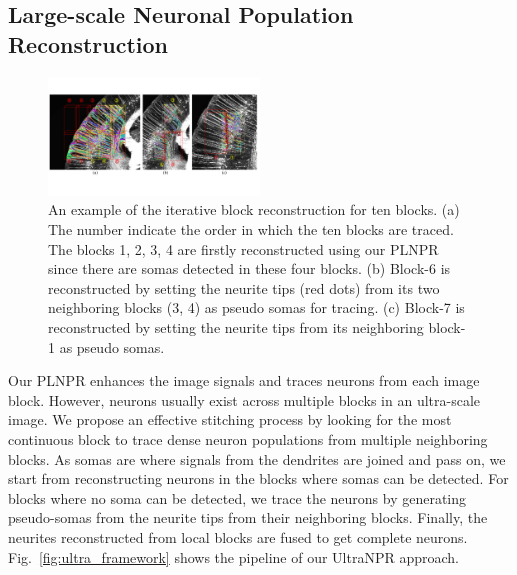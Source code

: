 \subsection{Large-scale Neuronal Population Reconstruction}
\label{sec:UltraNPR}

\begin{figure}[t]
	\centering
	\includegraphics[width=0.5\textwidth]{./Illustrations/ultranpr_block_search.pdf}
	\caption{An example of the iterative block reconstruction for ten blocks. (a) The number indicate the order in which the ten blocks are traced. The blocks 1, 2, 3, 4 are firstly reconstructed using our PLNPR since there are somas detected in these four blocks. (b) Block-6 is reconstructed by setting the neurite tips (red dots) from its two neighboring blocks (3, 4) as pseudo somas for tracing. (c) Block-7 is reconstructed by setting the neurite tips from its neighboring block-1 as pseudo somas.}
	\label{fig:blocksearch}
\end{figure}


Our PLNPR enhances the image signals  and traces neurons from each image block.
However, neurons usually exist across multiple blocks in an ultra-scale image. 
% 
We propose an effective stitching process by looking for the most continuous block to trace dense neuron populations from multiple neighboring blocks. 
%
As somas are where signals from the dendrites are joined and pass on, we start from reconstructing neurons in the blocks where somas can be detected.
For blocks where no soma can be detected, we trace the neurons by generating pseudo-somas from the neurite tips from their neighboring blocks. 
%
Finally, the neurites reconstructed from local blocks are fused to get complete neurons. 
Fig.~\ref{fig:ultra_framework} shows the pipeline of our UltraNPR approach. 


